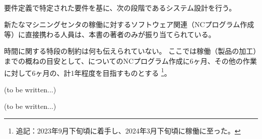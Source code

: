 {\paragraph*{\tpartnextstep}
要件定義で特定された要件を基に、次の段階であるシステム設計を行う。
}









新たなマシニングセンタの稼働に対するソフトウェア関連（NCプログラム作成等）に直接携わる人員は、本書の著者のみが振り当てられている。



時間に関する特段の制約は何も伝えられていない。
ここでは稼働（製品の加工）までの概ねの目安として、\Dimple についてのNCプログラム作成に6ヶ月、その他の作業に対して6ヶ月の、計1年程度を目指すものとする
\footnote{追記：2023年9月下旬頃に着手し、2024年3月下旬頃に稼働に至った。}。




(to be written...)







(to be written...)

\begin{appendices}
\end{appendices}

